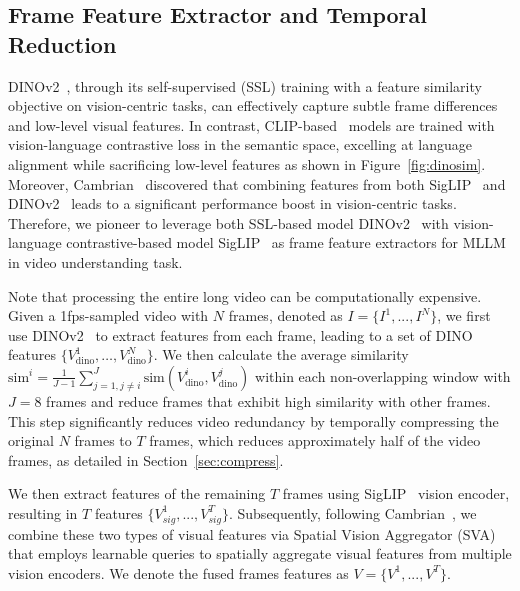 \subsection{Frame Feature Extractor and Temporal Reduction} 
\label{sec:dino}

 DINOv2~\citep{oquab2023dinov2}, through its self-supervised (SSL) training with a feature similarity objective on vision-centric tasks, can effectively capture subtle frame differences and low-level visual features. In contrast, CLIP-based~\citep{zhai2023sigmoid,radford2021learning} models are trained with vision-language contrastive loss in the semantic space, excelling at language alignment while sacrificing low-level features as shown in Figure~\ref{fig:dinosim}. Moreover, Cambrian~\citep{tong2024cambrian} discovered that combining features from both SigLIP~\citep{zhai2023sigmoid} and DINOv2~\citep{oquab2023dinov2} leads to a significant performance boost in vision-centric tasks. Therefore, we pioneer to leverage both SSL-based model DINOv2~\citep{oquab2023dinov2} with vision-language contrastive-based model SigLIP~\citep{zhai2023sigmoid} as frame feature extractors for MLLM in video understanding task.
 
 Note that processing the entire long video can be computationally expensive. Given a 1fps-sampled video with $N$ frames, denoted as $I=\{I^1,...,I^N\}$, we first use DINOv2~\citep{oquab2023dinov2} to extract features from each frame, leading to a set of DINO features $\{V_{\text{dino}}^1, \ldots, V_{\text{dino}}^N\}$. We then calculate the average similarity $\text{sim}^i = \frac{1}{J-1} \sum_{j=1, j \neq i}^J \text{sim}(V_{\text{dino}}^i, V_{\text{dino}}^j)$ within each non-overlapping window with $J=8$ frames and reduce frames that exhibit high similarity with other frames. This step significantly reduces video redundancy by temporally compressing the original $N$ frames to $T$ frames, which reduces approximately half of the video frames, as detailed in Section~\ref{sec:compress}. 
 
 We then extract features of the remaining $T$ frames using SigLIP~\citep{zhai2023sigmoid} vision encoder, resulting in $T$ features $\{V_{sig}^1,...,V_{sig}^T\}$. Subsequently, following Cambrian~\citep{tong2024cambrian}, we combine these two types of visual features via Spatial Vision Aggregator (SVA)~\citep{tong2024cambrian} that employs learnable queries to spatially aggregate visual features from multiple vision encoders. We denote the fused frames features as $V=\{V^1,...,V^T\}$.

